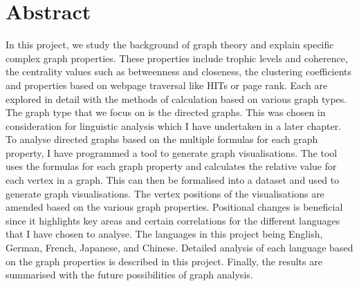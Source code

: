 \chapter*{Abstract}
In this project, we study the background of graph theory and explain specific complex graph properties. These properties include trophic levels and coherence, the centrality values such as betweenness and closeness, the clustering coefficients and properties based on webpage traversal like HITs or page rank. Each are explored in detail with the methods of calculation based on various graph types. The graph type that we focus on is the directed graphs. This was chosen in consideration for linguistic analysis which I have undertaken in a later chapter. To analyse directed graphs based on the multiple formulas for each graph property, I have programmed a tool to generate graph visualisations. The tool uses the formulas for each graph property and calculates the relative value for each vertex in a graph. This can then be formalised into a dataset and used to generate graph visualisations. The vertex positions of the visualisations are amended based on the various graph properties. Positional changes is beneficial since it highlights key areas and certain correlations for the different languages that I have chosen to analyse. The languages in this project being English, German, French, Japanese, and Chinese. Detailed analysis of each language based on the graph properties is described in this project. Finally, the results are summarised with the future possibilities of graph analysis.
